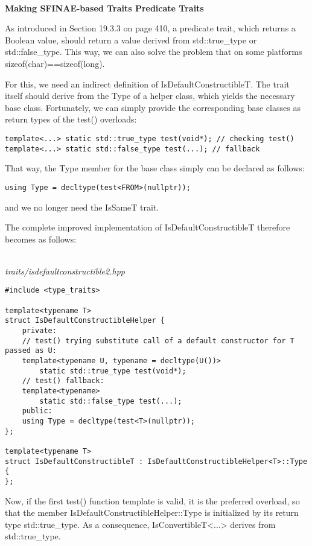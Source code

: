 \hspace*{\fill} \\ %
\noindent
\textbf{Making SFINAE-based Traits Predicate Traits}

As introduced in Section 19.3.3 on page 410, a predicate trait, which returns a Boolean value, should return a value derived from std::true\_type or std::false\_type. This way, we can also solve the problem that on some platforms sizeof(char)==sizeof(long).

For this, we need an indirect definition of IsDefaultConstructibleT. The trait itself should derive from the Type of a helper class, which yields the necessary base class. Fortunately, we can simply provide the corresponding base classes as return types of the test() overloads:

\begin{lstlisting}[style=styleCXX]
template<...> static std::true_type test(void*); // checking test()
template<...> static std::false_type test(...); // fallback
\end{lstlisting}

That way, the Type member for the base class simply can be declared as follows:

\begin{lstlisting}[style=styleCXX]
using Type = decltype(test<FROM>(nullptr));
\end{lstlisting}

and we no longer need the IsSameT trait.

The complete improved implementation of IsDefaultConstructibleT therefore becomes as follows:

\hspace*{\fill} \\ %
\noindent
\textit{traits/isdefaultconstructible2.hpp}
\begin{lstlisting}[style=styleCXX]
#include <type_traits>

template<typename T>
struct IsDefaultConstructibleHelper {
	private:
	// test() trying substitute call of a default constructor for T passed as U:
	template<typename U, typename = decltype(U())>
		static std::true_type test(void*);
	// test() fallback:
	template<typename>
		static std::false_type test(...);
	public:
	using Type = decltype(test<T>(nullptr));
};

template<typename T>
struct IsDefaultConstructibleT : IsDefaultConstructibleHelper<T>::Type {
};
\end{lstlisting}

Now, if the first test() function template is valid, it is the preferred overload, so that the member IsDefaultConstructibleHelper::Type is initialized by its return type std::true\_type. As a consequence, IsConvertibleT<...> derives from std::true\_type.

